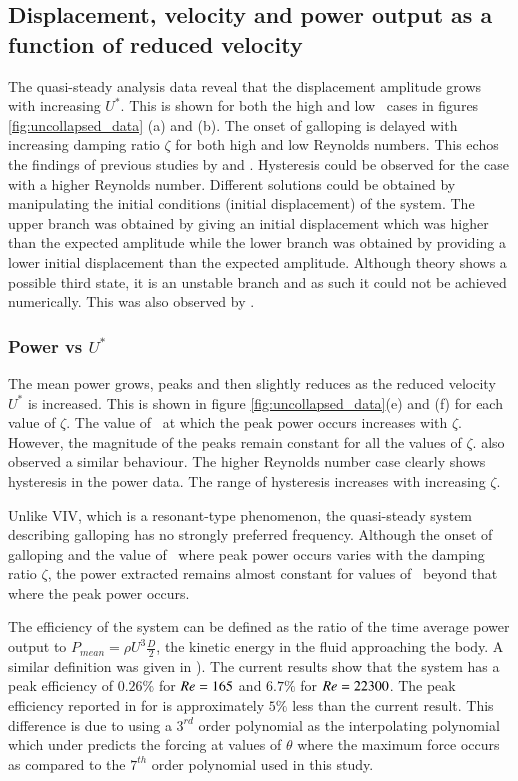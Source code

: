 \subsection{Displacement, velocity and power output as a function of reduced velocity}

 The quasi-steady analysis data reveal that the displacement amplitude grows with increasing $U^*$. This is shown for both the high and low \reynoldsnumber\ cases in figures \ref{fig:uncollapsed_data} (a) and (b). The onset of galloping is delayed with increasing damping ratio $\zeta$ for both high and low Reynolds numbers. This echos the findings of previous studies by \cite{Parkinson1964} and \cite{Barrero-Gil2010a}. Hysteresis could be observed for the case with a higher Reynolds number. Different solutions could be obtained by manipulating the initial conditions (initial displacement) of the system. The upper branch was obtained by giving an initial displacement which was higher than the expected amplitude while the lower branch was obtained by providing a lower initial displacement than the expected amplitude. Although theory shows a possible third state, it is an unstable branch and as such it could not be achieved numerically. This was also observed by \cite{Vio2007}.   

\subsubsection*{Power vs $U^*$}
 
 The mean power grows, peaks and then slightly reduces as the reduced velocity $U^*$ is increased. This is shown in figure \ref{fig:uncollapsed_data}(e) and (f) for each value of $\zeta$. The value of  \ustar\ at which the peak power occurs increases with $\zeta$. However, the magnitude of the peaks remain constant for all the values of $\zeta$. \citet{Barrero-Gil2010a} also observed a similar behaviour. The higher Reynolds number case clearly shows hysteresis in the power data. The range of hysteresis increases with increasing $\zeta$.

Unlike VIV, which is a resonant-type phenomenon, the quasi-steady system describing galloping has no strongly preferred frequency. Although the onset of galloping and the value of \ustar\ where peak power occurs varies with the damping ratio $\zeta$, the power extracted remains almost constant for values of \ustar\ beyond that where the peak power occurs. 

The efficiency of the system can be defined as the ratio of the time average power output to $P_{mean}=\rho U^3\frac{D}{2}$, the kinetic energy in the fluid approaching the body. A similar definition was given in \citet{Barrero-Gil2010a}). The current results show that the system has a peak efficiency of $0.26\%$  for $Re=165$ and $6.7\%$ for $Re=22300$. The peak efficiency reported in \citet{Barrero-Gil2010a} for  is approximately $5\%$ less than the current result. This difference is due to \cite{Barrero-Gil2010a} using a $3^{rd}$ order polynomial as the interpolating polynomial which under predicts the forcing at values of $\theta$ where the maximum force occurs as compared to the $7^{th}$ order polynomial used in this study.   
 

